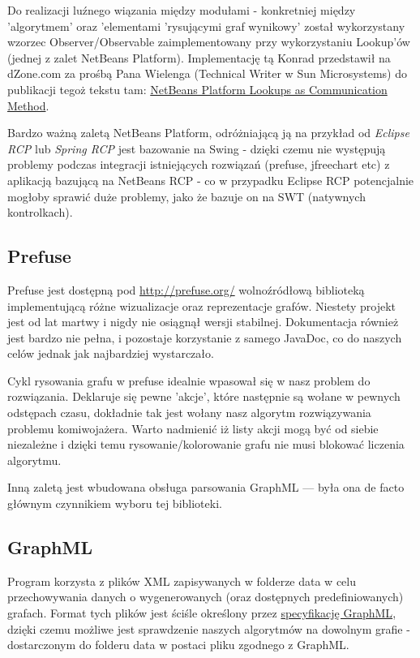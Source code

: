 \documentclass[a4paper]{article}
\begin{document}
Do realizacji luźnego wiązania między modułami - konkretniej między 'algorytmem' oraz 'elementami 'rysującymi graf wynikowy' został wykorzystany wzorzec Observer/Observable zaimplementowany przy wykorzystaniu Lookup'ów (jednej z zalet NetBeans Platform). Implementację tą Konrad przedstawił na dZone.com za prośbą Pana Wielenga (Technical Writer w Sun Microsystems) do publikacji tegoż tekstu tam: \href{http://netbeans.dzone.com/articles/netbeans-platform-lookups}{NetBeans Platform Lookups as Communication Method}.

Bardzo ważną zaletą NetBeans Platform, odróżniającą ją na przykład od \textit{Eclipse RCP} lub \textit{Spring RCP} jest bazowanie na Swing - dzięki czemu nie występują problemy podczas integracji istniejących rozwiązań (prefuse, jfreechart etc) z aplikacją bazującą na NetBeans RCP - co w przypadku Eclipse RCP potencjalnie mogłoby sprawić duże problemy, jako że bazuje on na SWT (natywnych kontrolkach).

\subsection{Prefuse}
Prefuse jest dostępną pod \href{http://prefuse.org/}{http://prefuse.org/} wolnoźródłową biblioteką implementującą różne wizualizacje oraz reprezentacje grafów. Niestety projekt jest od lat martwy i nigdy nie osiągnął wersji stabilnej. Dokumentacja również jest bardzo nie pełna, i pozostaje korzystanie z samego JavaDoc, co do naszych celów jednak jak najbardziej wystarczało. 

Cykl rysowania grafu w prefuse idealnie wpasował się w nasz problem do rozwiązania. Deklaruje się pewne 'akcje', które następnie są wołane w pewnych odstępach czasu, dokładnie tak jest wołany nasz algorytm rozwiązywania problemu komiwojażera. Warto nadmienić iż listy akcji mogą być od siebie niezależne i dzięki temu rysowanie/kolorowanie grafu nie musi blokować liczenia algorytmu. 

Inną zaletą jest wbudowana obsługa parsowania GraphML --- była ona de facto głównym czynnikiem wyboru tej biblioteki.

\subsection{GraphML}
Program korzysta z plików XML zapisywanych w folderze data w celu przechowywania danych o wygenerowanych (oraz dostępnych predefiniowanych) grafach. Format tych plików jest ściśle określony przez \href{http://graphml.graphdrawing.org/specification.html}{specyfikację GraphML}, dzięki czemu możliwe jest sprawdzenie naszych algorytmów na dowolnym grafie - dostarczonym do folderu data w postaci pliku zgodnego z GraphML.
\end{document}
